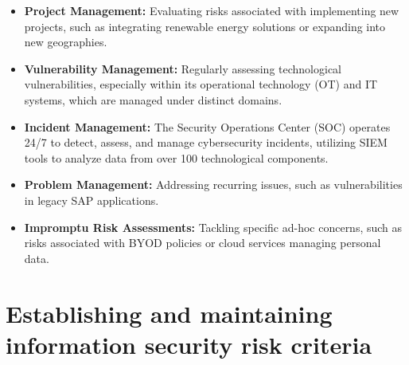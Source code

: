 \begin{itemize}
    \item \textbf{Project Management:} Evaluating risks associated with implementing new projects, such as integrating renewable energy solutions or expanding into new geographies.

    \item \textbf{Vulnerability Management:} Regularly assessing technological vulnerabilities, especially within its operational technology (OT) and IT systems, which are managed under distinct domains.

    \item \textbf{Incident Management:} The Security Operations Center (SOC) operates 24/7 to detect, assess, and manage cybersecurity incidents, utilizing SIEM tools to analyze data from over 100 technological components.

    \item \textbf{Problem Management:} Addressing recurring issues, such as vulnerabilities in legacy SAP applications.

    \item \textbf{Impromptu Risk Assessments:} Tackling specific ad-hoc concerns, such as risks associated with BYOD policies or cloud services managing personal data.
\end{itemize}

\section{Establishing and maintaining information security risk criteria}

